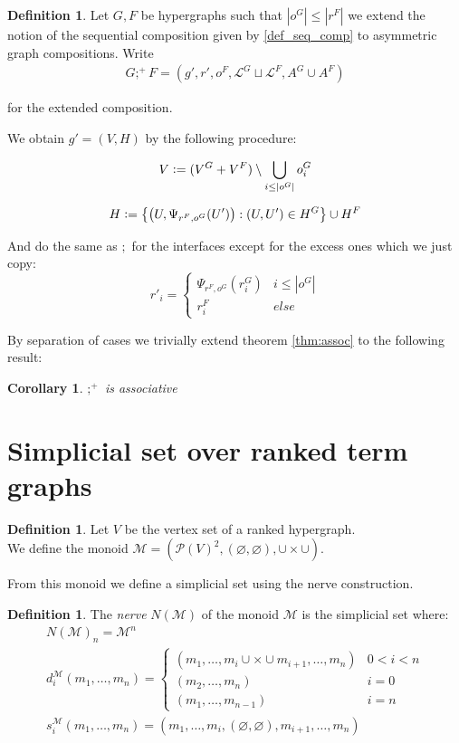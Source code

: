 \documentclass[12pt]{article}
\newtheorem{corollary}[theorem]{Corollary}
\theoremstyle{definition}
\newtheorem{definition}[theorem]{Definition}
\newcommand{\defeq}{\vcentcolon=}
\renewcommand{\P}{\mathcal{P}}
\newcommand{\1}{\mathbbm{1}}
\renewcommand{\L}{\mathcal{L}}
\newcommand{\M}{\mathcal{M}}
\newcommand{\seq}{;}
\begin{document}
\begin{definition}
    Let $G,F$ be hypergraphs such that $|o^G| \leq |r^F|$ we extend the notion of the sequential composition given by \ref{def_seq_comp} to asymmetric graph compositions. Write 
    \begin{align*}
        G\seq^+ F = (g', r', o^F, \L^G\sqcup \L^F, A^G\cup A^F)
    \end{align*}

    for the extended composition.

    We obtain $g' = (V,H)$ by the following procedure:

    \[
        V \defeq (V^G + V^F) \setminus \bigcup_{i\leq |o^G|}o^G_i    
    \]
    
    \[
        H \defeq \left\{ \left(U, \Psi_{r^F, o^G}(U')\right) : (U, U') \in H^G \right\} \cup H^F
    \]

    And do the same as $\seq$ for the interfaces except for the excess ones which we just copy:
    \[
        r'_i = 
        \begin{cases}
            \Psi_{r^F, o^G}(r^G_i) & i\leq |o^G|\\
            r^F_i & else
        \end{cases}
    \]
\end{definition} %

By separation of cases we trivially extend theorem \ref{thm:assoc} to the following result:
\begin{corollary}
    $\seq^+$ is associative
\end{corollary}
\newpage
\section{Simplicial set over ranked term graphs}
\begin{definition}
    Let $V$ be the vertex set of a ranked hypergraph.\\
    We define the monoid $\M = (\P(V)^2, (\varnothing, \varnothing), \cup\times\cup)$. 
\end{definition}

From this monoid we define a simplicial set using the nerve construction.

\begin{definition}
    The \emph{nerve} $N(\M)$ of the monoid $\M$ is the simplicial set where:
    \begin{align*}
        N(\M)_n = \M^n\\
        d^{\M}_i(m_1,\dots,m_n) = 
        \begin{cases}
            (m_1,\dots,m_i \cup\times\cup m_{i+1}, \dots, m_n) & 0 < i < n\\
            (m_2,\dots, m_n) & i = 0\\
            (m_1,\dots,m_{n-1}) & i = n
        \end{cases}\\
        s^{\M}_i(m_1,\dots,m_n) = (m_1, \dots, m_i, (\varnothing, \varnothing), m_{i+1}, \dots, m_n)\\
    \end{align*}
\end{definition}
\end{document}
